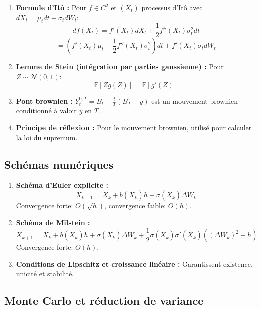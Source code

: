 \documentclass[12pt,a4paper]{article}
\theoremstyle{definition}
\newcommand{\E}{\mathbb{E}}
\begin{document}
\begin{enumerate}
    \item \textbf{Formule d'Itô :} Pour $f \in C^2$ et $(X_t)$ processus d'Itô avec $dX_t = \mu_t dt + \sigma_t dW_t$:
    \[
    df(X_t) = f'(X_t) dX_t + \frac{1}{2} f''(X_t) \sigma_t^2 dt
    \]
    \[
    = \left( f'(X_t)\mu_t + \frac{1}{2}f''(X_t)\sigma_t^2 \right) dt + f'(X_t)\sigma_t dW_t
    \]
    
    \item \textbf{Lemme de Stein (intégration par parties gaussienne) :} Pour $Z \sim \mathcal{N}(0,1)$:
    \[
    \E[Zg(Z)] = \E[g'(Z)]
    \]
    
    \item \textbf{Pont brownien :} $Y_t^{0,T} = B_t - \frac{t}{T}(B_T - y)$ est un mouvement brownien conditionné à valoir $y$ en $T$.
    
    \item \textbf{Principe de réflexion :} Pour le mouvement brownien, utilisé pour calculer la loi du supremum.
\end{enumerate}

\subsection{Schémas numériques}

\begin{enumerate}
    \item \textbf{Schéma d'Euler explicite :}
    \[
    \bar{X}_{k+1} = \bar{X}_k + b(\bar{X}_k) h + \sigma(\bar{X}_k) \Delta W_k
    \]
    Convergence forte: $O(\sqrt{h})$, convergence faible: $O(h)$.
    
    \item \textbf{Schéma de Milstein :}
    \[
    \bar{X}_{k+1} = \bar{X}_k + b(\bar{X}_k) h + \sigma(\bar{X}_k) \Delta W_k + \frac{1}{2}\sigma(\bar{X}_k)\sigma'(\bar{X}_k)((\Delta W_k)^2 - h)
    \]
    Convergence forte: $O(h)$.
    
    \item \textbf{Conditions de Lipschitz et croissance linéaire :} Garantissent existence, unicité et stabilité.
\end{enumerate}

\subsection{Monte Carlo et réduction de variance}
\end{document}
